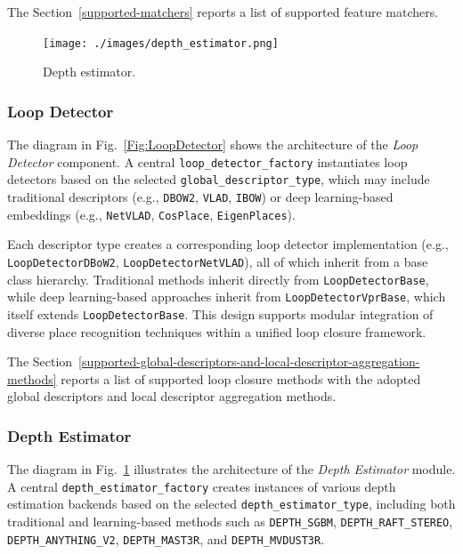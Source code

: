 \documentclass{article}
\begin{document}
The Section~\ref{supported-matchers} reports a list of supported feature matchers. 


\begin{figure}[!t]
\begin{center}
    \texttt{[image: ./images/depth\_estimator.png]}
\end{center}
\caption{Depth estimator.}
\label{Fig:DepthEstimator}
\end{figure}


\subsubsection{Loop Detector}

The diagram in Fig.~\ref{Fig:LoopDetector} shows the architecture of the \textit{Loop Detector} component. A central \texttt{loop\_detector\_factory} instantiates loop detectors based on the selected \texttt{global\_descriptor\_type}, which may include traditional descriptors (e.g., \texttt{DBOW2}, \texttt{VLAD}, \texttt{IBOW}) or deep learning-based embeddings (e.g., \texttt{NetVLAD}, \texttt{CosPlace}, \texttt{EigenPlaces}).

Each descriptor type creates a corresponding loop detector implementation (e.g., \texttt{LoopDetectorDBoW2}, \texttt{LoopDetectorNetVLAD}), all of which inherit from a base class hierarchy. Traditional methods inherit directly from \texttt{LoopDetectorBase}, while deep learning-based approaches inherit from \texttt{LoopDetectorVprBase}, which itself extends \texttt{LoopDetectorBase}. This design supports modular integration of diverse place recognition techniques within a unified loop closure framework.

The Section~\ref{supported-global-descriptors-and-local-descriptor-aggregation-methods} reports a list of supported loop closure methods with the adopted global descriptors and local descriptor aggregation methods.


\subsubsection{Depth Estimator}

The diagram in Fig.~\ref{Fig:DepthEstimator} illustrates the architecture of the \textit{Depth Estimator} module. A central \texttt{depth\_estimator\_factory} creates instances of various depth estimation backends based on the selected \texttt{depth\_estimator\_type}, including both traditional and learning-based methods such as \texttt{DEPTH\_SGBM}, \texttt{DEPTH\_RAFT\_STEREO}, \texttt{DEPTH\_ANYTHING\_V2}, \texttt{DEPTH\_MAST3R}, and \texttt{DEPTH\_MVDUST3R}.
\end{document}
